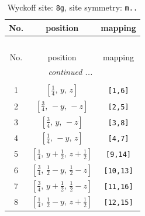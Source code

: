 \documentclass[fleqn,8pt]{jsarticle}
\begin{document}
\begin{longtable}{ccc}
\caption{Wyckoff site: {\tt 8g}, site symmetry: {\tt m..}}
 \\
 \hline \hline
No. & position & mapping \\ \hline \endfirsthead

\multicolumn{2}{l}{\tablename\ \thetable{}} \\
 \hline \hline
No. & position & mapping \\ \hline \endhead

 \hline \hline
\multicolumn{2}{r}{\footnotesize\it continued ...} \\ \endfoot

 \hline \hline
\multicolumn{2}{r}{} \\ \endlastfoot

1 & $\left[ \frac{1}{4},\, y,\, z \right]$ & {\tt [1,6]} \\ \hline
2 & $\left[ \frac{3}{4},\, - y,\, - z \right]$ & {\tt [2,5]} \\ \hline
3 & $\left[ \frac{3}{4},\, y,\, - z \right]$ & {\tt [3,8]} \\ \hline
4 & $\left[ \frac{1}{4},\, - y,\, z \right]$ & {\tt [4,7]} \\ \hline
5 & $\left[ \frac{1}{4},\, y + \frac{1}{2},\, z + \frac{1}{2} \right]$ & {\tt [9,14]} \\ \hline
6 & $\left[ \frac{3}{4},\, \frac{1}{2} - y,\, \frac{1}{2} - z \right]$ & {\tt [10,13]} \\ \hline
7 & $\left[ \frac{3}{4},\, y + \frac{1}{2},\, \frac{1}{2} - z \right]$ & {\tt [11,16]} \\ \hline
8 & $\left[ \frac{1}{4},\, \frac{1}{2} - y,\, z + \frac{1}{2} \right]$ & {\tt [12,15]} \\
\end{longtable}
\renewcommand{\arraystretch}{1.2}
\end{document}
